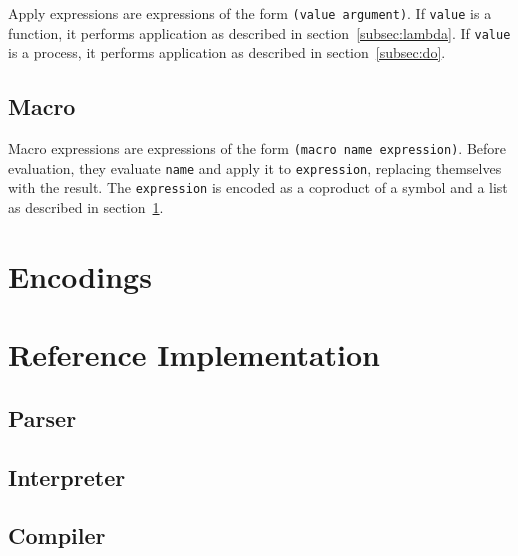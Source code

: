 \documentclass{article}
\begin{document}
\begin{multicols}{2}
        Apply expressions are expressions of the form \lstinline$(value argument)$.
        If \lstinline$value$ is a function, it performs application as described in section~\ref{subsec:lambda}.
        If \lstinline$value$ is a process, it performs application as described in section~\ref{subsec:do}.
        \newline

        \subsection{Macro}\label{subsec:macro}

        Macro expressions are expressions of the form \lstinline$(macro name expression)$.
        Before evaluation, they evaluate \lstinline$name$ and apply it to \lstinline$expression$, replacing themselves with the result.
        The \lstinline$expression$ is encoded as a coproduct of a symbol and a list as described in section~\ref{sec:encodings}.
        \newline
    \end{multicols}
    \newpage

    \section{Encodings}\label{sec:encodings}

    \begin{multicols*}{2}
        
    \end{multicols*}
    \newpage

    \section{Reference Implementation}\label{sec:implementation}

    \subsection{Parser}\label{subsec:parser}

    

    \subsection{Interpreter}\label{subsec:interpreter}

    

    \subsection{Compiler}\label{subsec:compiler}

    
\end{document}
